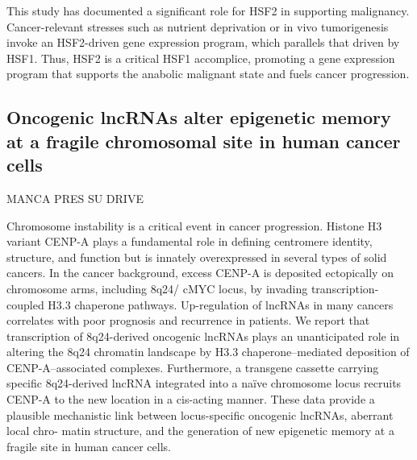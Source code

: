 This study has documented a significant role for HSF2 in supporting malignancy. Cancer-relevant stresses such as nutrient
deprivation or in vivo tumorigenesis invoke an HSF2-driven gene expression program, which parallels that driven by HSF1.
Thus, HSF2 is a critical HSF1 accomplice, promoting a gene expression program that supports the anabolic malignant state
and fuels cancer progression.

\subsection{Oncogenic lncRNAs alter epigenetic memory at a fragile chromosomal site in human cancer cells}
MANCA PRES SU DRIVE

Chromosome instability is a critical event in cancer progression. Histone H3 variant CENP-A plays a fundamental role in defining centromere identity, structure, and function but is innately overexpressed in several types of solid cancers. In the cancer background, excess CENP-A is deposited ectopically on chromosome arms, including 8q24/ cMYC locus, by invading transcription-coupled H3.3 chaperone pathways. Up-regulation of lncRNAs in many cancers correlates with poor prognosis and recurrence in patients. We report that transcription of 8q24-derived oncogenic lncRNAs plays an unanticipated role in altering the 8q24 chromatin landscape by H3.3 chaperone–mediated deposition of CENP-A–associated complexes. Furthermore, a transgene cassette carrying specific 8q24-derived lncRNA integrated into a naïve chromosome locus recruits CENP-A to the new location in a cis-acting manner. These data provide a plausible mechanistic link between locus-specific oncogenic lncRNAs, aberrant local chro- matin structure, and the generation of new epigenetic memory at a fragile site in human cancer cells.

